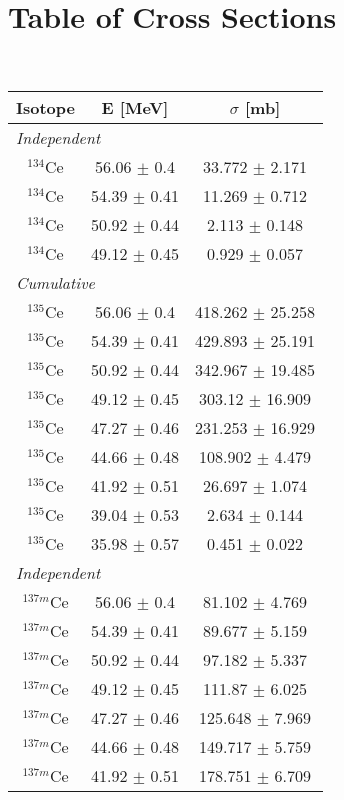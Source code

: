 \appendix
\section{Table of Cross Sections}
\label{xs_appendix}
\ \ 
\begin{ruledtabular}
\begin{tabular}{ccc}
Isotope & E [MeV] & $\sigma$ [mb] \\

\hline
\multicolumn{3}{l}{\textit{Independent}} \\ 
$^{134}$Ce & 56.06 $\pm$ 0.4 & 33.772 $\pm$ 2.171 \\ 
$^{134}$Ce & 54.39 $\pm$ 0.41 & 11.269 $\pm$ 0.712 \\ 
$^{134}$Ce & 50.92 $\pm$ 0.44 & 2.113 $\pm$ 0.148 \\ 
$^{134}$Ce & 49.12 $\pm$ 0.45 & 0.929 $\pm$ 0.057 \\ 
\hline
\multicolumn{3}{l}{\textit{Cumulative}} \\ 
$^{135}$Ce & 56.06 $\pm$ 0.4 & 418.262 $\pm$ 25.258 \\ 
$^{135}$Ce & 54.39 $\pm$ 0.41 & 429.893 $\pm$ 25.191 \\ 
$^{135}$Ce & 50.92 $\pm$ 0.44 & 342.967 $\pm$ 19.485 \\ 
$^{135}$Ce & 49.12 $\pm$ 0.45 & 303.12 $\pm$ 16.909 \\ 
$^{135}$Ce & 47.27 $\pm$ 0.46 & 231.253 $\pm$ 16.929 \\ 
$^{135}$Ce & 44.66 $\pm$ 0.48 & 108.902 $\pm$ 4.479 \\ 
$^{135}$Ce & 41.92 $\pm$ 0.51 & 26.697 $\pm$ 1.074 \\ 
$^{135}$Ce & 39.04 $\pm$ 0.53 & 2.634 $\pm$ 0.144 \\ 
$^{135}$Ce & 35.98 $\pm$ 0.57 & 0.451 $\pm$ 0.022 \\ 
\hline
\multicolumn{3}{l}{\textit{Independent}} \\ 
$^{137m}$Ce & 56.06 $\pm$ 0.4 & 81.102 $\pm$ 4.769 \\ 
$^{137m}$Ce & 54.39 $\pm$ 0.41 & 89.677 $\pm$ 5.159 \\ 
$^{137m}$Ce & 50.92 $\pm$ 0.44 & 97.182 $\pm$ 5.337 \\ 
$^{137m}$Ce & 49.12 $\pm$ 0.45 & 111.87 $\pm$ 6.025 \\ 
$^{137m}$Ce & 47.27 $\pm$ 0.46 & 125.648 $\pm$ 7.969 \\ 
$^{137m}$Ce & 44.66 $\pm$ 0.48 & 149.717 $\pm$ 5.759 \\ 
$^{137m}$Ce & 41.92 $\pm$ 0.51 & 178.751 $\pm$ 6.709 \\ 

\end{tabular}
\end{ruledtabular}
